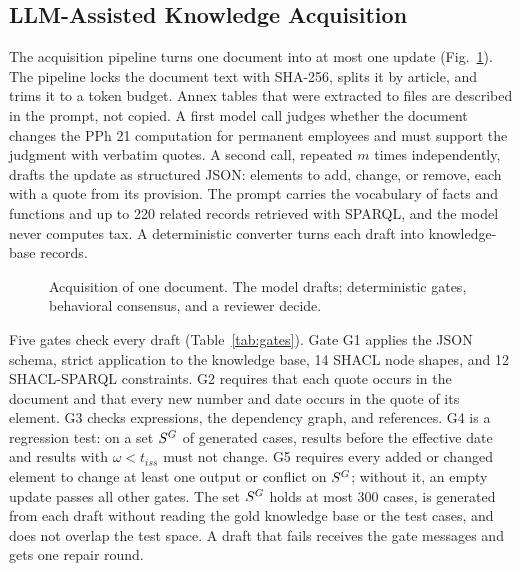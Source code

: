 \subsection{LLM-Assisted Knowledge Acquisition}
\label{sec:acquisition}
The acquisition pipeline turns one document into at most one update (Fig.~\ref{fig:acqflow}). The pipeline locks the document text with SHA-256, splits it by article, and trims it to a token budget. Annex tables that were extracted to files are described in the prompt, not copied. A first model call judges whether the document changes the PPh 21 computation for permanent employees and must support the judgment with verbatim quotes. A second call, repeated $m$ times independently, drafts the update as structured JSON: elements to add, change, or remove, each with a quote from its provision. The prompt carries the vocabulary of facts and functions and up to 220 related records retrieved with SPARQL, and the model never computes tax. A deterministic converter turns each draft into knowledge-base records.

\begin{figure}[!t]
\centering
\figAcquisitionFlow
\caption{Acquisition of one document. The model drafts; deterministic gates, behavioral consensus, and a reviewer decide.}
\label{fig:acqflow}
\end{figure}

Five gates check every draft (Table~\ref{tab:gates}). Gate G1 applies the JSON schema, strict application to the knowledge base, 14 SHACL node shapes, and 12 SHACL-SPARQL constraints. G2 requires that each quote occurs in the document and that every new number and date occurs in the quote of its element. G3 checks expressions, the dependency graph, and references. G4 is a regression test: on a set $S^{G}$ of generated cases, results before the effective date and results with $\omega < t_{\mathit{iss}}$ must not change. G5 requires every added or changed element to change at least one output or conflict on $S^{G}$; without it, an empty update passes all other gates. The set $S^{G}$ holds at most 300 cases, is generated from each draft without reading the gold knowledge base or the test cases, and does not overlap the test space. A draft that fails receives the gate messages and gets one repair round.


